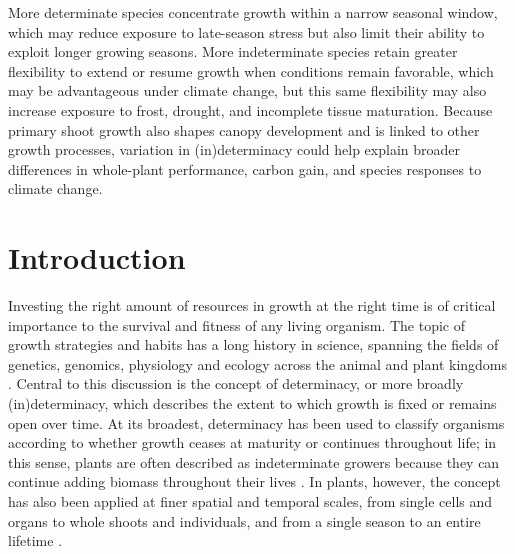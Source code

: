 \documentclass{article}
\begin{document}
More determinate species concentrate growth within a narrow seasonal window, which may reduce exposure to late-season stress but also limit their ability to exploit longer growing seasons. More indeterminate species retain greater flexibility to extend or resume growth when conditions remain favorable, which may be advantageous under climate change, but this same flexibility may also increase exposure to frost, drought, and incomplete tissue maturation. Because primary shoot growth also shapes canopy development and is linked to other growth processes, variation in (in)determinacy could help explain broader differences in whole-plant performance, carbon gain, and species responses to climate change.\\
		
			\newpage
			
\section*{Introduction} 
		Investing the right amount of resources in growth at the right time is of critical importance to the survival and fitness of any living organism. The topic of growth strategies and habits has a long history in science, spanning the fields of genetics, genomics, physiology and ecology across the animal and plant kingdoms \citep{stearnsEvolutionLifeHistories1998a}. Central to this discussion is the concept of determinacy, or more broadly (in)determinacy, which describes the extent to which growth is fixed or remains open over time. At its broadest, determinacy has been used to classify organisms according to whether growth ceases at maturity or continues throughout life; in this sense, plants are often described as indeterminate growers because they can continue adding biomass throughout their lives \citep{ejsmondHowTimeGrowth2010, karkachTrajectoriesModelsIndividual2006}. In plants, however, the concept has also been applied at finer spatial and temporal scales, from single cells and organs to whole shoots and individuals, and from a single season to an entire lifetime \citep{mcdanielInductionDeterminationDevelopmental1992a, karkachTrajectoriesModelsIndividual2006}.\\
		
\end{document}
